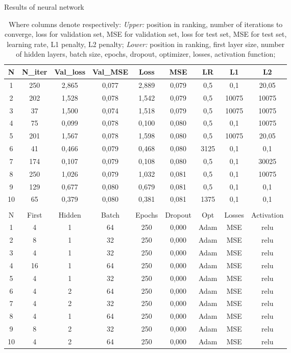 \documentclass{Trade_template}
\numberwithin{equation}{section}
\begin{document}
\begin{table}[!htp]
\footnotesize{
\centering
\caption{Results of neural network}
\begin{tabular}{*{9}{c}}
\toprule
N & N\_iter & Val\_loss & Val\_MSE & Loss & MSE & LR & L1 & L2 \\ \midrule
1 & 250 & 2,865 & 0,077 & 2,889 & 0,079 & 0,5 & 0,1 & 20,05 \\
2 & 202 & 1,528 & 0,078 & 1,542 & 0,079 & 0,5 & 10075 & 10075 \\
3 & 37 & 1,500 & 0,074 & 1,518 & 0,079 & 0,5 & 10075 & 10075\\
4 & 75 & 0,099 & 0,078 & 0,100 & 0,080 & 0,5 & 0,1 & 10075 \\
5 & 201 & 1,567 & 0,078 & 1,598 & 0,080 & 0,5 & 10075 & 20,05 \\
6 & 41 & 0,466 & 0,079 & 0,468 & 0,080 & 3125 & 0,1 & 0,1\\
7 & 174 & 0,107 & 0,079 & 0,108 & 0,080 & 0,5 & 0,1 & 30025 \\
8 & 250 & 1,026 & 0,079 & 1,032 & 0,081 & 0,5 & 0,1 & 10075 \\
9 & 129 & 0,677 & 0,080 & 0,679 & 0,081 & 0,5 & 0,1 & 0,1 \\
10 & 65 & 0,379 & 0,080 & 0,381 & 0,081 & 1375 & 0,1 & 0,1 \\ \bottomrule
& & & & & & & &  \\
N & First  & Hidden & Batch & Epochs & Dropout & Opt & Losses & Activation \\ \midrule
1 & 4 & 1 & 64 & 250 & 0,000 &   Adam & MSE & relu \\
2 & 8 & 1 & 32 & 250 & 0,000 &   Adam & MSE & relu \\
3 & 4 & 1 & 32 & 250 & 0,000 &   Adam & MSE & relu \\
4 & 16 & 1 & 64 & 250 & 0,000 &   Adam & MSE & relu \\
5 & 4 & 1 & 32 & 250 & 0,000 &   Adam & MSE & relu \\
6 & 4 & 2 & 64 & 250 & 0,000 &   Adam & MSE & relu \\
7 & 4 & 2 & 32 & 250 & 0,000 &   Adam & MSE & relu \\
8 & 4 & 1 & 64 & 250 & 0,000 &   Adam & MSE & relu \\
9 & 8 & 2 & 32 & 250 & 0,000 &   Adam & MSE & relu \\
10 & 4 & 2 & 64 & 250 & 0,000 &   Adam & MSE & relu \\ \bottomrule
\end{tabular}
\caption*{\small{Where columns denote respectively: \textit{Upper:} position in ranking, number of iterations to converge, loss for validation set, MSE for validation set, loss for test set, MSE for test set, learning rate, L1 penalty, L2 penalty; \textit{Lower:} position in ranking, first layer size, number of hidden layers, batch size, epochs, dropout, optimizer, losses, activation function;}}}
\end{table}
\end{document}
